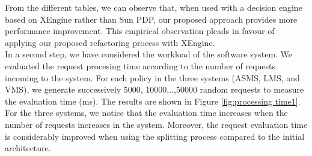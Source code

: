 From the different tables, we can observe that, when used with a decision engine based on XEngine rather than Sun PDP, our proposed approach provides more performance improvement. 
This empirical observation pleads in favour of applying our proposed refactoring process with XEngine.\\

In a second step, we have considered the workload of the software system. We evaluated the request procesing time according to the number of requests incoming to the system. 
For each policy in the three systems (ASMS, LMS, and VMS), we generate successively 5000, 10000,..,50000 random requests to measure the evaluation time (ms).
The results are shown in Figure \ref{fig:processing time1}. For the three systems, we notice that the evaluation time increases when the number of requests increases in the system. 
Moreover, the request evaluation time is considerably improved when using the splitting process compared to the initial architecture.

